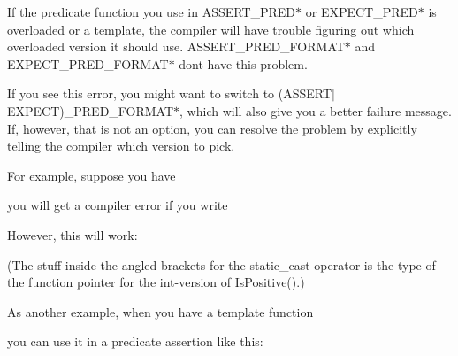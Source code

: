 If the predicate function you use in {\ttfamily A\+S\+S\+E\+R\+T\+\_\+\+P\+R\+E\+D$\ast$} or {\ttfamily E\+X\+P\+E\+C\+T\+\_\+\+P\+R\+E\+D$\ast$} is overloaded or a template, the compiler will have trouble figuring out which overloaded version it should use. {\ttfamily A\+S\+S\+E\+R\+T\+\_\+\+P\+R\+E\+D\+\_\+\+F\+O\+R\+M\+A\+T$\ast$} and {\ttfamily E\+X\+P\+E\+C\+T\+\_\+\+P\+R\+E\+D\+\_\+\+F\+O\+R\+M\+A\+T$\ast$} don\textquotesingle{}t have this problem.

If you see this error, you might want to switch to {\ttfamily (A\+S\+S\+E\+R\+T$\vert$\+E\+X\+P\+E\+CT)\+\_\+\+P\+R\+E\+D\+\_\+\+F\+O\+R\+M\+A\+T$\ast$}, which will also give you a better failure message. If, however, that is not an option, you can resolve the problem by explicitly telling the compiler which version to pick.

For example, suppose you have


\begin{DoxyCode}{0}
\DoxyCodeLine{\}}
\DoxyCodeLine{\}}
\end{DoxyCode}


you will get a compiler error if you write


\begin{DoxyCode}{0}
\end{DoxyCode}


However, this will work\+:


\begin{DoxyCode}{0}
\end{DoxyCode}


(The stuff inside the angled brackets for the {\ttfamily static\+\_\+cast} operator is the type of the function pointer for the {\ttfamily int}-\/version of {\ttfamily Is\+Positive()}.)

As another example, when you have a template function


\begin{DoxyCode}{0}
\DoxyCodeLine{\}}
\end{DoxyCode}


you can use it in a predicate assertion like this\+:


\begin{DoxyCode}{0}
\end{DoxyCode}



